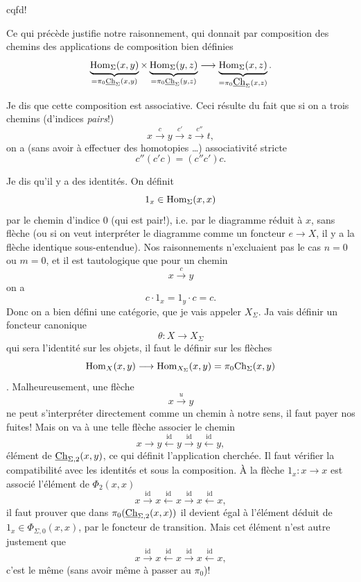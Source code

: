 \hfill cqfd!


Ce qui précède justifie notre raisonnement, qui donnait par composition des chemins des applications de composition bien définies
\[
\underbrace{\mathrm{Hom}_\Sigma(x,y)}_{=\pi_0\underline{\mathrm{Ch}}_\Sigma(x,y)} \times \underbrace{\mathrm{Hom}_\Sigma(y,z)}_{=\pi_0\underline{\mathrm{Ch}}_\Sigma(y,z)} \longrightarrow \underbrace{\mathrm{Hom}_\Sigma(x,z)}_{=\pi_0\underline{\textstyle\mathrm{Ch}}_\Sigma(x,z)}.
\]

Je dis que cette composition est associative. Ceci résulte du fait que si on a trois chemins (d'indices \textit{pairs}!)
\[
x \xrightarrow{c} y \xrightarrow{c'} z \xrightarrow{c''} t,
\]
on a (sans avoir à effectuer des homotopies \dots) associativité stricte
\[
c''(c'c) = (c''c')c.
\]

Je dis qu'il y a des identités. On définit
\[
1_x \in \mathrm{Hom}_\Sigma(x,x)
\]
par le chemin d'indice 0 (qui est pair!), i.e. par le diagramme réduit à $x$, sans flèche (ou si on veut interpréter le diagramme comme un foncteur $e \longrightarrow X$, il y a la flèche identique sous-entendue). Nos raisonnements n'excluaient pas le cas $n = 0$ ou $m = 0$, et il est tautologique que pour un chemin
\[
x \xrightarrow{c} y
\]
on a
\[
c \cdot 1_x = 1_y \cdot c = c.
\]
Donc on a bien défini une catégorie, que je vais appeler $X_\Sigma$. Ja vais définir un foncteur canonique %
\[
\theta : X \longrightarrow X_\Sigma
\]
qui sera l'identité sur les objets, il faut le définir sur les flèches
\[
\mathrm{Hom}_X(x,y) \longrightarrow \mathrm{Hom}_{X_\Sigma}(x,y) = \pi_0\mathrm{Ch}_\Sigma(x,y)
\]
. Malheureusement, une flèche
\[
x \xrightarrow{u} y
\]
ne peut s'interpréter directement comme un chemin à notre sens, il faut payer nos fuites! Mais on va à une telle flèche associer le chemin
\[
x \longrightarrow y \xleftarrow{\mathrm{id}} y \xrightarrow{\mathrm{id}} y \xleftarrow{\mathrm{id}} y,
\]
élément de $\underline{\mathrm{Ch}}_{\Sigma,2}(x,y)$, ce qui définit l'application cherchée. Il faut vérifier la compatibilité avec les identités et sous la composition. À la flèche $1_x : x \longrightarrow x$ est associé l'élément de $\Phi_2(x,x)$
\[
x \xrightarrow{\mathrm{id}} x \xleftarrow{\mathrm{id}} x \xrightarrow{\mathrm{id}} x \xleftarrow{\mathrm{id}} x,
\]
il faut prouver que dans $\pi_0(\underline{\mathrm{Ch}}_{\Sigma,2}(x,x))$ il devient égal à l'élément déduit de $1_x \in \Phi_{\Sigma,0}(x,x)$, par le foncteur de transition. Mais cet élément n'est autre justement que
\[
x \xrightarrow{\mathrm{id}} x \xleftarrow{\mathrm{id}} x \xrightarrow{\mathrm{id}} x \xleftarrow{\mathrm{id}} x,
\]
c'est le même (sans avoir même à passer au $\pi_0$)!

